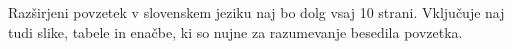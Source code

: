 Razširjeni povzetek v slovenskem jeziku naj bo dolg vsaj 10 strani. 
Vključuje naj tudi slike, tabele in enačbe, ki so nujne za razumevanje besedila povzetka.